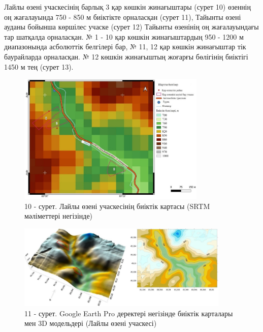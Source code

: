 \begin{multicols}{2}
Лайлы өзені учаскесінің барлық 3 қар көшкін жинағыштары (сурет 10)
өзеннің оң жағалауында 750 - 850 м биіктікте орналасқан (сурет 11),
Тайынты өзені ауданы бойынша көршілес учаске (сурет 12) Тайынты өзенінің
оң жағалауындағы тар шатқалда орналасқан. № 1 - 10 қар көшкін
жинағыштардың 950 - 1200 м диапазонында асболюттік белгілері бар, № 11,
12 қар көшкін жинағыштар тік баурайларда орналасқан. № 12 көшкін
жинағыштың жоғарғы бөлігінің биіктігі 1450 м тең (сурет 13).
\end{multicols}

\begin{figure}[H]
	\centering
	\includegraphics[width=0.8\textwidth]{media/ict2/image213}
	\caption*{10 - сурет. Лайлы өзені учаскесінің биіктік картасы (SRTM мәліметтері негізінде)}
\end{figure}

\begin{figure}[H]
	\centering
	\includegraphics[width=0.9\textwidth]{media/ict2/image214}
	\caption*{11 - сурет. Google Earth Pro деректері негізінде биіктік карталары мен 3D модельдері (Лайлы өзені учаскесі)}
\end{figure}

